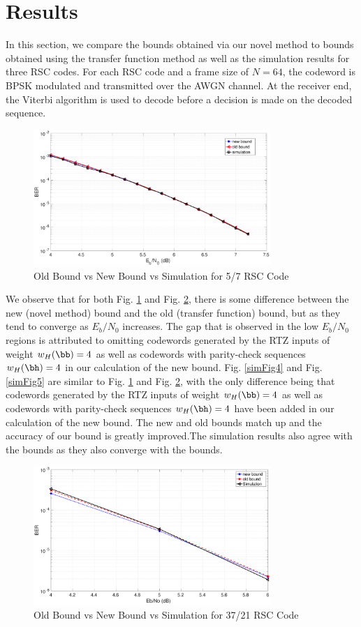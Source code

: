 \section{Results}
\label{sec6}
In this section, we compare the bounds obtained via our novel method to bounds obtained using the transfer function method as well as the simulation results for three RSC codes. For each RSC code and a frame size of $N=64$, the codeword is BPSK modulated and transmitted over the AWGN channel. At the receiver end, the Viterbi algorithm is used to decode before a decision is made on the decoded sequence.

\begin{figure}[h!]
\centering
		\includegraphics[width=0.8\textwidth]{./Images/RSC_5_7_lower_weights.eps}
		\caption{Old Bound vs New Bound vs Simulation for 5/7 RSC Code}
		\label{simFig1}
		\end{figure}
We observe that for both Fig. \ref{simFig1} and Fig. \ref{simFig2}, there is some difference between the new (novel method) bound and the old (transfer function) bound, but as they tend to converge as $E_b/N_0$ increases. The gap that is observed in the low $E_b/N_0$ regions is attributed to omitting codewords generated by the RTZ inputs of weight $w_H(\bb)=4$ as well as codewords with parity-check sequences $w_H(\bh)=4$ in our calculation of the new bound. 
Fig. \ref{simFig4} and Fig. \ref{simFig5} are similar to  Fig. \ref{simFig1} and Fig. \ref{simFig2}, with the only difference being that codewords generated by the RTZ inputs of weight $w_H(\bb)=4$ as well as codewords with parity-check sequences $w_H(\bh)=4$ have been added in our calculation of the new bound. The new and old bounds match up and the accuracy of our bound is greatly improved.The simulation results also agree with the bounds as they also converge with the bounds.
\begin{figure}[h!]
\centering
		\includegraphics[width=0.8\textwidth]{./Images/RSC_37_21_v2.eps}
		\caption{Old Bound vs New Bound vs Simulation for 37/21 RSC Code}
		\label{simFig2}
		\end{figure}
